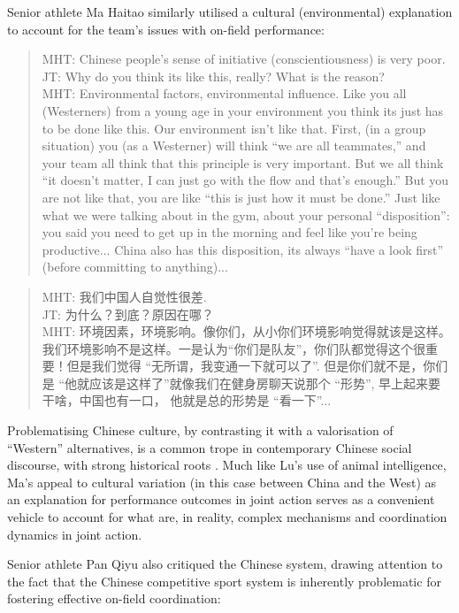 \begin{CJK}{UTF8}{gbsn}
Senior athlete Ma Haitao similarly utilised a cultural (environmental) explanation to account for the team's issues with on-field performance:

\begin{quote}
  MHT: Chinese people's sense of initiative (conscientiousness) is very poor.\\
  JT: Why do you think its like this, really? What is the reason? \\ MHT: Environmental factors, environmental influence.  Like you all (Westerners) from a young age in your environment you think its just has to be done like this.  Our environment isn’t like that.  First, (in a group situation) you (as a Westerner) will think ``we are all teammates,'' and your team all think that this principle is very important.  But we all think ``it doesn’t matter, I can just go with the flow and that’s enough.''  But you are not like that, you are like ``this is just how it must be done.'' Just like what we were talking about in the gym, about your personal ``disposition'': you said you need to get up in the morning and feel like you're being productive... China also has this disposition, its always ``have a look first'' (before committing to anything)...
\end{quote}

\begin{quote}
  MHT: 我们中国人自觉性很差. \\
  JT: 为什么？到底？原因在哪？\\
  MHT: 环境因素，环境影响。像你们，从小你们环境影响觉得就该是这样。我们环境影响不是这样。一是认为``你们是队友''，你们队都觉得这个很重要！但是我们觉得 ``无所谓，我变通一下就可以了''. 但是你们就不是，你们是 ``他就应该是这样了''就像我们在健身房聊天说那个 ``形势'', 早上起来要干啥，中国也有一口， 他就是总的形势是  ``看一下''...
\end{quote}

Problematising Chinese culture, by contrasting it with a valorisation of ``Western'' alternatives, is a common trope in contemporary Chinese social discourse, with strong historical roots \citep{Liu1995a}.  Much like Lu's use of animal intelligence, Ma's appeal to cultural variation (in this case between China and the West) as an explanation for performance outcomes in joint action serves as a convenient vehicle to account for what are, in reality, complex mechanisms and coordination dynamics in joint action.

Senior athlete Pan Qiyu also critiqued the Chinese system, drawing attention to the fact that the Chinese competitive sport system is inherently problematic for fostering effective on-field coordination:


\end{CJK}
